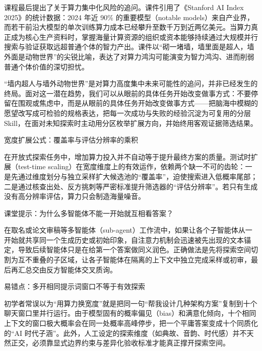 \documentclass[UTF8,a4paper,11pt,fontset=fandol]{ctexart}
\begin{document}
课程最后提出了关于算力集中化风险的追问。课件引用了《Stanford AI Index 2025》的统计数据：2024 年近 90\% 的重要模型（notable models）来自产业界，而若干前沿大模型的单次训练算力成本已经攀升至数千万到近两亿美元。当算力真正成为核心生产资料时，掌握海量计算资源的组织或资本能够持续通过大规模并行搜索与验证获取远超普通个体的智力产出。课件以“砌一堵墙，墙里面是超人，墙外面是动物世界”的尖锐比喻，表达了对算力鸿沟可能演变为智力鸿沟、进而削弱普通个体价值的深切担忧。

“墙内超人与墙外动物世界”是对算力高度集中未来可能性的追问，并非已经发生的终局。面对这一潜在趋势，我们可以从眼前的具体任务开始改变做事方式：不要停留在围观或焦虑中，而是从眼前的具体任务开始改变做事方式——把脑海中模糊的愿望改写成可检验的规格表达，把每一次成功与失败的经验沉淀为可复用的分层 Skill，在面对未知探索时主动用分区枚举扩展方向，并始终用客观证据筛选结果。

\begin{importantbox}{宽度扩展公式：覆盖率与评估分辨率的乘积}

在开放式探索任务中，增加算力投入并不自动等于提升最终方案的质量。测试时扩展（test-time scaling）在宽度维度上的有效运作，依赖两个缺一不可的齿轮：一是先通过维度划分与独立采样扩大候选池的“覆盖率”，迫使搜索进入低概率尾部；二是通过核查出处、反方挑刺等严密标准提升筛选器的“评估分辨率”。若只有生成没有高分辨率评估，算力只会制造海量噪音。

\end{importantbox}

\begin{knowledgebox}{课堂提示：为什么多智能体不能一开始就互相看答案？}

在取名或论文审稿等多智能体（sub-agent）工作流中，如果让各个子智能体从一开始就共享同一个生成历史或初始印象，自注意力机制会迅速被先出现的文本锚定，导致后续智能体只是在给第一个答案做同义润色。正确做法是先将探索空间切割为互不重叠的子区域，让各子智能体在隔离的上下文中独立完成采样或初审，最后再汇总交由反方智能体交叉质询。

\end{knowledgebox}

\begin{warningbox}{易错点：多开相同提示词窗口不等于有效探索}

初学者常误以为“用算力换宽度”就是把同一句“帮我设计几种架构方案”复制到十个聊天窗口里并行运行。由于模型固有的概率偏见（bias）和满意化倾向，十个相同上下文的窗口极大概率会在同一处概率高峰停步，把一个平庸答案变成十个同质化的“AI 时代子涵”。此外，人工设定的探索维度（如典故、音韵、时代感）并不天然正交，必须靠显式边界约束与差异化验收标准才能真正撑开探索空间。

\end{warningbox}
\end{document}

